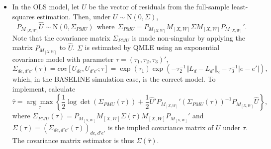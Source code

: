 \documentclass[preprint]{imsart}
\numberwithin{equation}{section}
\theoremstyle{plain}
\theoremstyle{definition}
\renewcommand{\(}{\left(}
\renewcommand{\)}{\right)}
\renewcommand{\[}{\left[}
\renewcommand{\]}{\right]}
\begin{document}
{\begin{enumerate}
	\begin{itemize}
		\item In the OLS model, let $\widehat{U}$ be the vector of residuals from the full-sample least-squares estimation. 
		Then, under $U\sim \mathrm N(0,\Sigma)$,
		$$P_{M_{[X,W]}}\widehat{U}\sim \mathrm N(0,\Sigma_{PMU} ) \ \ \text{where} \  \ \Sigma_{PMU}=P_{M_{[X,W]}}M_{[X,W]}\Sigma M_{[X,W]}P_{M_{[X,W]}}'.$$
		Note that the covariance matrix $\Sigma_{PMU}$ is made non-singular by applying the matrix $P_{M_{[X,W]}}$ to $\widehat{U}$. 
		$\Sigma$ is estimated by QMLE using an exponential covariance model with parameter $\tau=(\tau_1,\tau_2,\tau_3)'$,
		\begin{equation*}
			\Sigma_{de,d'e'}(\tau)=cov[U_{de},U_{d'e'};\tau]=\exp(\tau_1)\exp (-\tau_2^{-1} \Vert L_d-L_{d'}\Vert_2-\tau_3^{-1}|e-e'|),
		\end{equation*}
		which, in the {BASELINE} simulation case, is the correct model. 
		To implement, calculate
		$$\widehat{\tau}=\underset{\tau}{\arg\max}\left\lbrace \frac{1}{2}\log \det (\Sigma_{PMU}(\tau) )+\frac{1}{2}\widehat{U}'P_{M_{[X,W]}}'(\Sigma_{PMU}(\tau) )^{-1}P_{M_{[X,W]}}\widehat{U}\right\rbrace ,$$
		where $\Sigma_{PMU}(\tau)=P_{M_{[X,W]}}M_{[X,W]}\Sigma(\tau) M_{[X,W]}P_{M_{[X,W]}}'$
		and $\Sigma(\tau)=(\Sigma_{de,d'e'}(\tau))_{de,d'e'}$ is the implied covariance matrix of $U$ under $\tau$.
		The covariance matrix estimator is thus $\Sigma(\widehat{\tau})$. 
		

\end{itemize}
\end{enumerate}}
\end{document}
